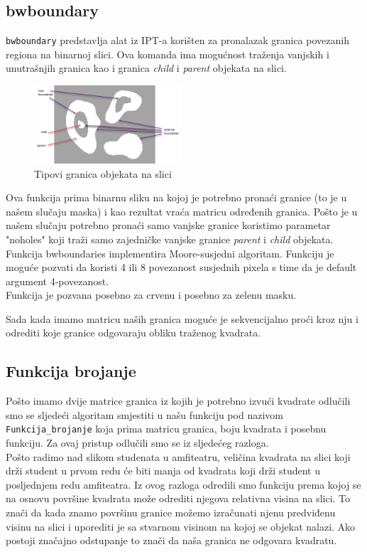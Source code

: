 \documentclass[a4paper,12pt]{article}
\begin{document}
\subsection{bwboundary}

\texttt{bwboundary} predstavlja alat iz IPT-a korišten za pronalazak granica povezanih regiona na binarnoj slici.
Ova komanda ima mogućnost traženja vanjskih i unutrašnjih granica kao i granica \textit {child} i  \textit{parent} objekata na slici.

\begin{figure}[htbp]
    \centering
    \includegraphics[width=0.49\textwidth]{img/bwboundaries.png}
    \caption{Tipovi granica objekata na slici}
    \label{fig:redMaskgreenMask}
\end{figure}


Ova funkcija prima binarnu sliku na kojoj je potrebno pronaći granice (to je u našem slučaju maska) i kao rezultat vraća matricu određenih granica. 
Pošto je u našem slučaju potrebno pronaći samo vanjske granice koristimo parametar "noholes"  koji traži samo zajedničke vanjske granice \textit{parent} i \textit{child} objekata.
Funkcija bwboundaries implementira Moore-susjedni algoritam. Funkciju je moguće pozvati da koristi 4 ili 8 povezanost susjednih pixela s time da je default argument 4-povezanost.
\\
Funkcija je pozvana posebno za crvenu i posebno za zelenu masku.

Sada kada imamo matricu naših granica moguće je sekvencijalno proći kroz nju i odrediti koje granice odgovaraju obliku traženog kvadrata.

\subsection{Funkcija brojanje}



Pošto imamo dvije matrice granica iz kojih je potrebno izvući kvadrate odlučili smo se sljedeći algoritam smjestiti u našu funkciju pod nazivom \texttt{Funkcija\_brojanje} koja prima matricu granica,  boju kvadrata i posebnu funkciju.
Za ovaj pristup odlučili smo se iz sljedećeg razloga.\\
Pošto radimo nad slikom studenata u amfiteatru, veličina kvadrata na slici koji drži student u prvom redu će biti manja od kvadrata koji drži student u posljednjem redu amfiteatra. 
Iz ovog razloga odredili smo funkciju prema kojoj se na osnovu površine kvadrata može odrediti njegova relativna visina na slici. To znači da kada znamo površinu granice možemo izračunati njenu predviđenu visinu na slici i uporediti je sa stvarnom visinom na kojoj se objekat nalazi. 
Ako postoji značajno odstupanje to znači da naša granica ne odgovara kvadratu.
\\
\end{document}
